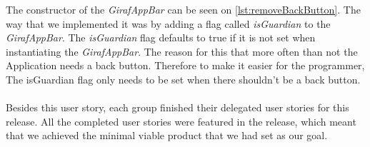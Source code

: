 The constructor of the \textit{GirafAppBar} can be seen on \autoref{lst:removeBackButton}. 
The way that we implemented it was by adding a flag called \textit{isGuardian} to the \textit{GirafAppBar}. 
The \textit{isGuardian} flag defaults to true if it is not set when instantiating the \textit{GirafAppBar}. The reason for this that more often than not the Application needs a back button. Therefore to make it easier for the programmer, The isGuardian flag only needs to be set when there shouldn't be a back button.
\\\\
Besides this user story, each group finished their delegated user stories for this release. All the completed user stories were featured in the release, which meant that we achieved the minimal viable product that we had set as our goal. 
